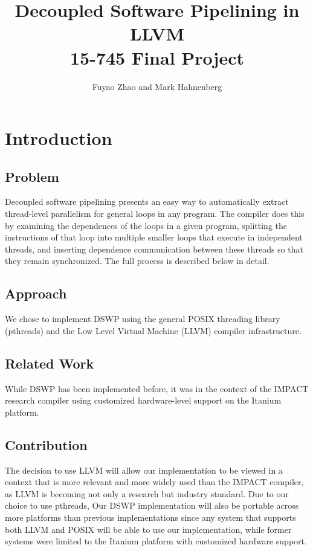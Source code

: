 \documentclass[11pt]{article}
\title{Decoupled Software Pipelining in LLVM \\
        {\large 15-745 Final Project}}
\author{Fuyao Zhao and Mark Hahnenberg}
\date{}
\begin{document}
\maketitle

\section{Introduction}
\subsection{Problem}
Decoupled software pipelining presents an easy way to automatically extract thread-level parallelism for general loops in any program.  The compiler does this by examining the dependences of the loops in a given program, splitting the instructions of that loop into multiple smaller loops that execute in independent threads, and inserting dependence communication between these threads so that they remain synchronized.  The full process is described below in detail.  

\subsection{Approach}
We chose to implement DSWP using the general POSIX threading library (pthreads) and the Low Level Virtual Machine (LLVM) compiler infrastructure.  

\subsection{Related Work}
While DSWP has been implemented before, it was in the context of the IMPACT research compiler using customized hardware-level support on the Itanium platform.

\subsection{Contribution}
The decision to use LLVM will allow our implementation to be viewed in a context that is more relevant and more widely used than the IMPACT compiler, as LLVM is becoming not only a research but industry standard.  Due to our choice to use pthreads, Our DSWP implementation will also be portable across more platforms than previous implementations since any system that supports both LLVM and POSIX will be able to use our implementation, while former systems were limited to the Itanium platform with customized hardware support.
\end{document}

